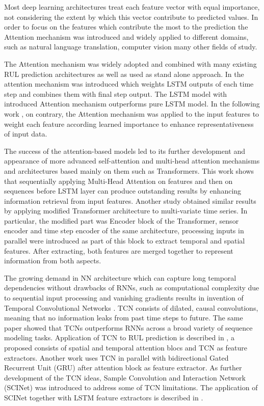 Most deep learning architectures treat each feature vector with equal importance, not considering the extent by which this vector contribute to predicted values. In order to focus on the features which contribute the most to the prediction the Attention mechanism was introduced and widely applied to different domains, such as natural language translation, computer vision many other fields of study.  

The Attention mechanism was widely adopted and combined with many existing RUL prediction architectures as well as used as stand alone approach. In  \cite{RNNATN2019} the attention mechanism was introduced which weights LSTM outputs of each time step and combines them with final step output. The LSTM model with introduced Attention mechanism outperforms pure LSTM model. In the following work \cite{AGCNN2021}, on contrary, the Attention mechanism was applied to the input features to weight each feature according learned importance to enhance representativeness of input data.

The success of the attention-based models led to its further development and appearance of more advanced self-attention and multi-head attention mechanisms and architectures based mainly on them such as Transformers.  This work \cite{MDSA2022} shows that sequentially applying Multi-Head Attention on features and then on sequences before LSTM layer can produce outstanding results by enhancing information retrieval from input features.  Another study \cite{Zhang2022} obtained similar results by applying modified Transformer architecture to multi-variate time series.  In particular, the modified part was Encoder block of the Transformer, sensor encoder and time step encoder of the same architecture, processing inputs in parallel were introduced as part of this block to extract temporal and spatial features. After extracting, both features are merged together to represent information from both aspects.

The growing demand in NN architecture which can capture long temporal dependencies without drawbacks of RNNs, such as computational complexity due to sequential input processing and vanishing gradients results in invention of Temporal Convolutional Networks \cite{TCN2018}. TCN consists of dilated, causal convolutions, meaning that no information leaks from past time steps to future. The same paper showed that TCNs outperforms RNNs across a broad variety of sequence modeling tasks. Application of TCN to RUL prediction is described in \cite{DATCNN2021}, a proposed consists of spatial and temporal attention blocs and TCN as feature extractors. 
Another work \cite{BiGRUTCN2022} uses TCN in parallel with bidirectional Gated Recurrent Unit (GRU) after attention block as feature extractor.
As further development of the TCN ideas, Sample Convolution and Interaction Network (SCINet) was introduced to address some of TCN limitations. The application of SCINet together with LSTM feature extractors is described in \cite{Zhevnenko2023}.

